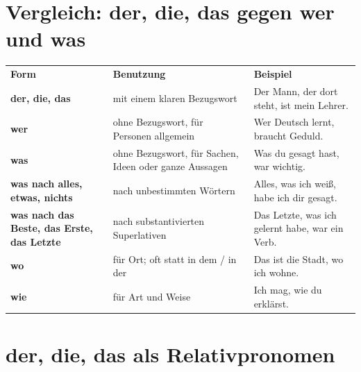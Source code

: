 \documentclass[a4paper,11pt]{article}
\begin{document}
\section{Vergleich: der, die, das gegen wer und was}

\begin{center}
\begin{tabular}{>{\bfseries}p{3.6cm}p{5.2cm}p{5.2cm}}
\rowcolor{HeaderBlueDark}
\color{white}\textbf{Form} & \color{white}\textbf{Benutzung} & \color{white}\textbf{Beispiel} \\
der, die, das & mit einem klaren Bezugswort & Der Mann, der dort steht, ist mein Lehrer. \\
wer & ohne Bezugswort, für Personen allgemein & Wer Deutsch lernt, braucht Geduld. \\
was & ohne Bezugswort, für Sachen, Ideen oder ganze Aussagen & Was du gesagt hast, war wichtig. \\
was nach alles, etwas, nichts & nach unbestimmten Wörtern & Alles, was ich weiß, habe ich dir gesagt. \\
was nach das Beste, das Erste, das Letzte & nach substantivierten Superlativen & Das Letzte, was ich gelernt habe, war ein Verb. \\
wo & für Ort; oft statt in dem / in der & Das ist die Stadt, wo ich wohne. \\
wie & für Art und Weise & Ich mag, wie du erklärst. \\
\end{tabular}
\end{center}

\section{der, die, das als Relativpronomen}
\end{document}
